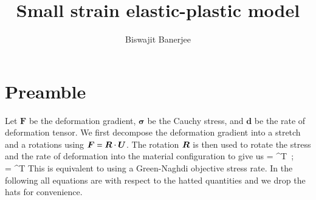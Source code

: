 \documentclass[twoside,10pt,a4paper]{article}
\begin{document}

\title{Small strain elastic-plastic model}
\author{Biswajit Banerjee}

\maketitle
\tableofcontents
\newpage

\section{Preamble}
Let $\boldsymbol{F}$ be the deformation gradient, $\boldsymbol{\sigma}$ be the 
Cauchy stress, and $\boldsymbol{d}$ be the rate of deformation tensor.  We
first decompose the deformation gradient into a stretch and a rotations using
$\BF = \BR\cdot\BU$.  The rotation $\BR$ is then used to rotate the stress and
the rate of deformation into the material configuration to give us
\Beq
  \widehat{\Bsig} = \BR^T\cdot\Bsig\cdot\BR ~;~~
  \widehat{\Bd} = \BR^T\cdot\Bd\cdot\BR 
\Eeq
This is equivalent to using a Green-Naghdi objective stress rate.  In the 
following all equations are with respect to the hatted quantities and we 
drop the hats for convenience.
\end{document}
